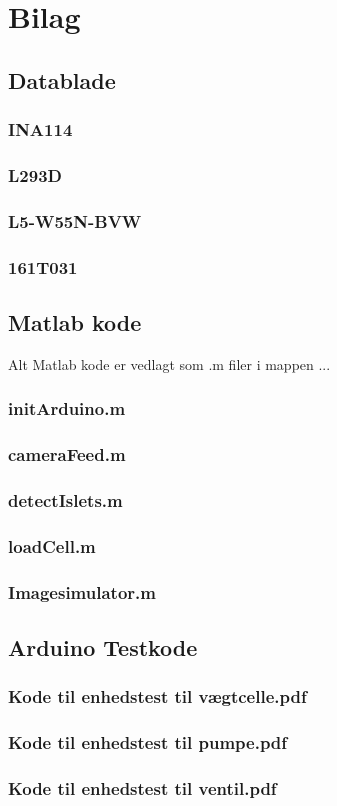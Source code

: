 \chapter{Bilag}
\section{Datablade}
\subsection{INA114}
\label{bilag:INA114}
\subsection{L293D}
\label{bilag:L293D}

\subsection{L5-W55N-BVW}
\label{bilag:L5-W55N-BVW}

\subsection{161T031}
\label{bilag:161T031}

\section{Matlab kode}
Alt Matlab kode er vedlagt som .m filer i mappen ... 
\subsection{initArduino.m} \label{bilag:initArduino}
\subsection{cameraFeed.m} \label{bilag:cameraFeed}
\subsection{detectIslets.m}
\subsection{loadCell.m}
\subsection{Imagesimulator.m} \label{bilag:camsimulation}
\section{Arduino Testkode}
\subsection{Kode til enhedstest til vægtcelle.pdf} 
\label{bilag:TKloadcell}
\subsection{Kode til enhedstest til pumpe.pdf}
\label{bilag:TKpumpe}
\subsection{Kode til enhedstest til ventil.pdf}
\label{bilag:TKventil}
